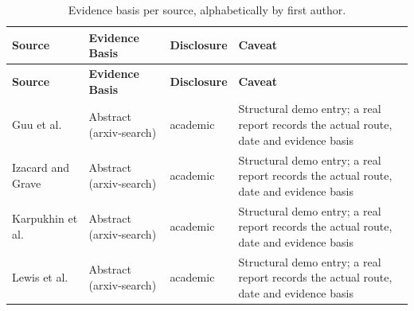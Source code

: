 \documentclass[11pt]{article}
\begin{document}
{\small
\begin{longtable}{@{}>{\raggedright\arraybackslash}p{3.3cm}>{\raggedright\arraybackslash}p{2.9cm}>{\raggedright\arraybackslash}p{2.1cm}>{\raggedright\arraybackslash}p{6.8cm}@{}}
\caption{Evidence basis per source, alphabetically by first author.}\\
\toprule
\textbf{Source} & \textbf{Evidence Basis} & \textbf{Disclosure} & \textbf{Caveat} \\
\midrule
\endfirsthead
\toprule
\textbf{Source} & \textbf{Evidence Basis} & \textbf{Disclosure} & \textbf{Caveat} \\
\midrule
\endhead
Guu et al.~\citep{guu2020realm} & Abstract (arxiv-search) & academic & Structural demo entry; a real report records the actual route, date and evidence basis \\
Izacard and Grave~\citep{izacard2021fid} & Abstract (arxiv-search) & academic & Structural demo entry; a real report records the actual route, date and evidence basis \\
Karpukhin et al.~\citep{karpukhin2020dpr} & Abstract (arxiv-search) & academic & Structural demo entry; a real report records the actual route, date and evidence basis \\
Lewis et al.~\citep{lewis2020rag} & Abstract (arxiv-search) & academic & Structural demo entry; a real report records the actual route, date and evidence basis \\
\bottomrule
\end{longtable}
}



\end{document}
